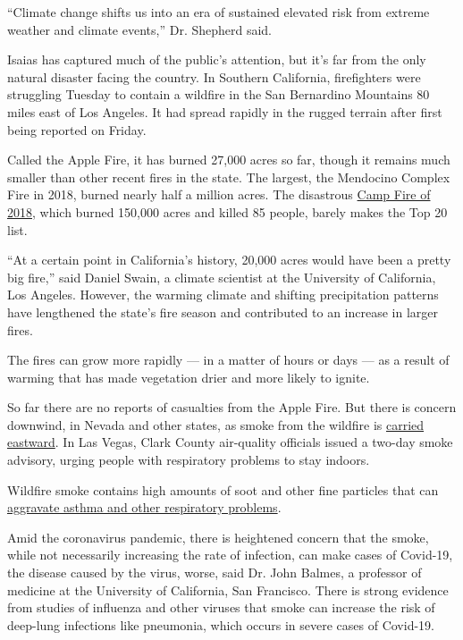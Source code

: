 ``Climate change shifts us into an era of sustained elevated risk from
extreme weather and climate events,'' Dr. Shepherd said.

Isaias has captured much of the public's attention, but it's far from
the only natural disaster facing the country. In Southern California,
firefighters were struggling Tuesday to contain a wildfire in the San
Bernardino Mountains 80 miles east of Los Angeles. It had spread rapidly
in the rugged terrain after first being reported on Friday.

Called the Apple Fire, it has burned 27,000 acres so far, though it
remains much smaller than other recent fires in the state. The largest,
the Mendocino Complex Fire in 2018, burned nearly half a million acres.
The disastrous
\href{https://www.nytimes.com/interactive/2019/07/31/magazine/paradise-camp-fire-california.html}{Camp
Fire of 2018}, which burned 150,000 acres and killed 85 people, barely
makes the Top 20 list.

``At a certain point in California's history, 20,000 acres would have
been a pretty big fire,'' said Daniel Swain, a climate scientist at the
University of California, Los Angeles. However, the warming climate and
shifting precipitation patterns have lengthened the state's fire season
and contributed to an increase in larger fires.

The fires can grow more rapidly --- in a matter of hours or days --- as
a result of warming that has made vegetation drier and more likely to
ignite.

So far there are no reports of casualties from the Apple Fire. But there
is concern downwind, in Nevada and other states, as smoke from the
wildfire is
\href{https://rapidrefresh.noaa.gov/hrrr/HRRRsmoke/jsloopLocalDiskDateDomainZipTZA.cgi?dsKeys=hrrr_smoke_jet:\&runTime=2020080314\&plotName=trc1_t4sfc\&fcstInc=60\&numFcsts=49\&model=hrrr\&ptitle=HRRR-Smoke\%20Model\%20Fields\%20-\%20Experimental\&maxFcstLen=48\&fcstStrLen=-1\&resizePlot=1\&domain=t4}{carried
eastward}. In Las Vegas, Clark County air-quality officials issued a
two-day smoke advisory, urging people with respiratory problems to stay
indoors.

Wildfire smoke contains high amounts of soot and other fine particles
that can
\href{https://www.nytimes.com/2019/10/24/climate/california-wildfires-climate-change.html}{aggravate
asthma and other respiratory problems}.

Amid the coronavirus pandemic, there is heightened concern that the
smoke, while not necessarily increasing the rate of infection, can make
cases of Covid-19, the disease caused by the virus, worse, said Dr. John
Balmes, a professor of medicine at the University of California, San
Francisco. There is strong evidence from studies of influenza and other
viruses that smoke can increase the risk of deep-lung infections like
pneumonia, which occurs in severe cases of Covid-19.


